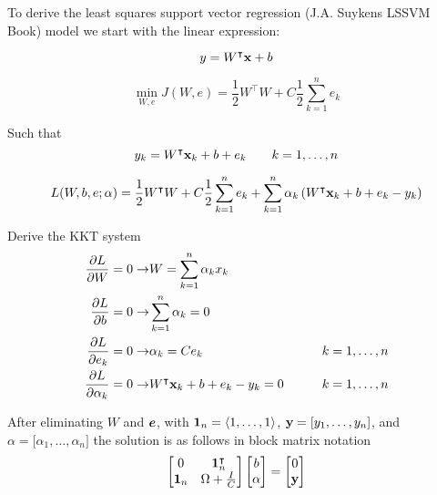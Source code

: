 To derive the least squares support vector regression (J.A. Suykens LSSVM Book) model we start with the linear expression:

\begin{equation}
  y=W^{\intercal}\vb{x}+b
\end{equation}

\begin{equation}
  \min_{W,e} J(W,e) = \frac{1}{2}W^{\intercal}W + C\frac{1}{2}\sum_{k=1}^{n}e_{k}
\end{equation}

Such that
\begin{equation}
  y_{k}=W^{\intercal}\vb{x}_{k}+b+e_{k} \qquad k=1,\dots,n
\end{equation}

\begin{equation}
  L(W,b,e;\vb{\alpha}) = \frac{1}{2}W^{\intercal}W + C\frac{1}{2}\sum_{k=1}^{n}e_{k} + \sum_{k=1}^{n}\alpha_{k} \left(W^{\intercal}\vb{x}_{k}+b+e_{k} - y_{k} \right)
\end{equation}

Derive the KKT system
\begin{equation}
  \begin{split}
    \pdv{L}{W} = 0 \rightarrow          & W = \sum_{k=1}^{n}\alpha_{k}x_{k}                                \\
    \pdv{L}{b} = 0 \rightarrow          & \sum_{k=1}^{n}\alpha_{k} = 0                                     \\
    \pdv{L}{e_{k}} = 0 \rightarrow      & \alpha_{k} = C e_{k}                        & \qquad k=1,\dots,n \\
    \pdv{L}{\alpha_{k}} = 0 \rightarrow & W^{\intercal}\vb{x}_{k}+b+e_{k} - y_{k} = 0 & \qquad k=1,\dots,n \\
  \end{split}
\end{equation}

After eliminating $W$ and $\vb*{e}$, with $\vb{1}_{n} = \langle 1,\dots,1\rangle$, $\vb{y} = \lbrack y_1, \dots, y_n \rbrack $, and ${\alpha} = \lbrack \alpha_1, \dots, \alpha_n \rbrack $ the solution is as follows in block matrix notation
\begin{equation} \label{eq:lssvr_solution}
  \begin{bmatrix}
    0          & \vb{1}_{n}^{\intercal} \\
    \vb{1}_{n} & \Omega + \frac{I}{C}
  \end{bmatrix}
  \begin{bmatrix}
    b           \\
    \vb{\alpha} \\
  \end{bmatrix}
  =
  \begin{bmatrix}
    0      \\
    \vb{y} \\
  \end{bmatrix}
\end{equation}

